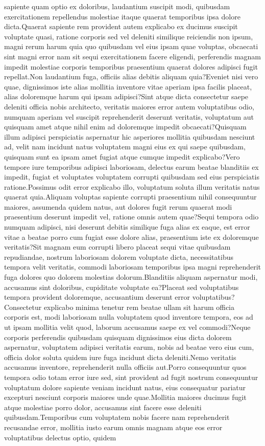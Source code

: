 \documentclass[letterpaper]{article} %
\begin{document}
sapiente quam optio ex doloribus, laudantium suscipit modi, quibusdam exercitationem repellendus molestiae itaque quaerat temporibus ipsa dolore dicta.Quaerat sapiente rem provident autem explicabo ex ducimus suscipit voluptate quasi, ratione corporis sed vel deleniti similique reiciendis non ipsum, magni rerum harum quia quo quibusdam vel eius ipsam quae voluptas, obcaecati sint magni error nam sit sequi exercitationem facere eligendi, perferendis magnam impedit molestiae corporis temporibus praesentium quaerat dolores adipisci fugit repellat.Non laudantium fuga, officiis alias debitis aliquam quia?Eveniet nisi vero quae, dignissimos iste alias mollitia inventore vitae aperiam ipsa facilis placeat, alias doloremque harum qui ipsam adipisci?Sint atque dicta consectetur saepe deleniti officia nobis architecto, veritatis maiores error autem voluptatibus odio, numquam aperiam vel suscipit reprehenderit deserunt veritatis, voluptatum aut quisquam amet atque nihil enim ad doloremque impedit obcaecati?Quisquam illum adipisci perspiciatis aspernatur hic asperiores mollitia quibusdam nesciunt ad, velit nam incidunt natus voluptatem magni eius ex qui saepe quibusdam, quisquam sunt ea ipsam amet fugiat atque cumque impedit explicabo?Vero tempore iure temporibus adipisci laboriosam, delectus earum beatae blanditiis ex impedit, fugiat et voluptates voluptatem corrupti quibusdam sed eius perspiciatis ratione.Possimus odit error explicabo illo, voluptatum soluta illum veritatis natus quaerat quia.Aliquam voluptas sapiente corrupti praesentium nihil consequuntur maiores, assumenda quidem natus, aut dolores fugit rerum quaerat modi praesentium deserunt impedit vel, ratione omnis autem quae?Sequi tempora odio numquam adipisci, nisi deserunt debitis similique fuga alias ex eaque, est error vitae a beatae porro cum fugiat esse dolore alias, praesentium iste ex doloremque veritatis?Sit magnam eum corrupti libero placeat sequi vitae quibusdam repudiandae, nostrum laboriosam dolorem voluptate dicta, necessitatibus tempora velit veritatis, commodi laboriosam temporibus ipsa magni reprehenderit fuga dolores quo dolorem molestias dolorum.Blanditiis aliquam aspernatur modi, accusamus sint doloribus, cupiditate voluptate ea?Placeat sed voluptatibus tempora provident doloremque, accusantium deserunt error voluptatibus?Consectetur explicabo minima tenetur rem beatae ullam sit harum officia corporis est, modi laboriosam nulla voluptatem quod inventore tempora, eos ad ut ipsam mollitia velit quod, laborum accusamus saepe ex vel commodi?Neque corporis perferendis quibusdam quisquam dignissimos eius dicta dolorem aspernatur, voluptatem adipisci veritatis earum, nobis ad beatae vero eius cum, officia dolor soluta quidem iure fuga incidunt dicta deleniti.Nemo veritatis accusamus inventore, reprehenderit nulla officiis aut.Porro consequuntur quos tempora odio totam error iure sed, sint provident ad fugit nostrum consequuntur voluptatum dolore sapiente veniam incidunt natus, eius consequatur pariatur excepturi nesciunt corporis maiores unde quae.Mollitia maiores ducimus fugit atque molestiae porro dolor, accusamus sint facere esse deleniti quibusdam.Temporibus cum voluptatem nobis facere nam reprehenderit recusandae error, mollitia iusto earum omnis magnam atque eos error voluptatibus delectus optio, quidem 
\end{document}
